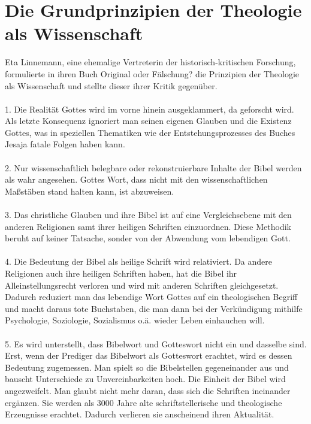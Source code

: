 \section*{Die Grundprinzipien der Theologie als Wissenschaft}
Eta Linnemann, eine ehemalige Vertreterin der historisch-kritischen Forschung, formulierte in ihren Buch \glqq Original oder Fälschung?\grqq{} die Prinzipien der Theologie als Wissenschaft und stellte dieser ihrer Kritik gegenüber.
\\ ~ \\
1. Die Realität Gottes wird im vorne hinein ausgeklammert, da geforscht wird. Als letzte Konsequenz ignoriert man seinen eigenen Glauben und die Existenz Gottes, was in speziellen Thematiken wie der Entstehungsprozesses des Buches Jesaja fatale Folgen haben kann.
\\ ~ \\
2. Nur wissenschaftlich belegbare oder rekonstruierbare Inhalte der Bibel werden als wahr angesehen. Gottes Wort, dass nicht mit den wissenschaftlichen Maßstäben stand halten kann, ist abzuweisen. 
\\ ~ \\
3. Das christliche Glauben und ihre Bibel ist auf eine Vergleichsebene mit den anderen Religionen samt ihrer heiligen Schriften einzuordnen. Diese Methodik beruht auf keiner Tatsache, sonder von der Abwendung vom lebendigen Gott.
\\ ~ \\
4. Die Bedeutung der Bibel als heilige Schrift wird relativiert. Da andere Religionen auch ihre heiligen Schriften haben, hat die Bibel ihr Alleinstellungsrecht verloren und wird mit anderen Schriften gleichgesetzt. Dadurch reduziert man das lebendige Wort Gottes auf ein theologischen Begriff und macht daraus tote Buchstaben, die man dann bei der Verkündigung mithilfe Psychologie, Soziologie, Sozialismus o.ä. wieder Leben einhauchen will. 
\\ ~ \\
5. Es wird unterstellt, dass Bibelwort und Gotteswort nicht ein und dasselbe sind. Erst, wenn der Prediger das Bibelwort als Gotteswort erachtet, wird es dessen Bedeutung zugemessen. Man spielt so die Bibelstellen gegeneinander aus und bauscht Unterschiede zu Unvereinbarkeiten hoch. Die Einheit der Bibel wird angezweifelt. Man glaubt nicht mehr daran, dass sich die Schriften ineinander ergänzen. Sie werden als 3000 Jahre alte schriftstellerische und theologische Erzeugnisse erachtet. Dadurch verlieren sie anscheinend ihren Aktualität. 
\\ ~ \\
